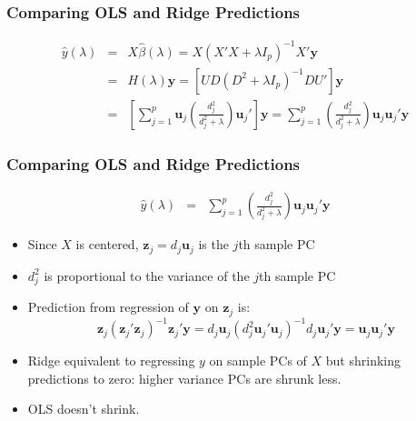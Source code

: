 \begin{frame}
  \frametitle{Comparing OLS and Ridge Predictions}

  \begin{eqnarray*}
    \widehat{y}(\lambda) &=&  X\widehat{\beta}(\lambda) = X\left( X'X + \lambda I_p \right)^{-1}X'\mathbf{y} \\
    &=& H(\lambda) \mathbf{y}=  \left[ UD\left( D^2 + \lambda I_p \right)^{-1}DU' \right]\mathbf{y} \\
  &=& \left[ \sum_{j=1}^p \mathbf{u}_j  \left( \frac{d_j^2}{d_j^2 + \lambda} \right)\mathbf{u}_j'\right]\mathbf{y} =  \sum_{j=1}^p   \left( \frac{d_j^2}{d_j^2 + \lambda} \right)\mathbf{u}_j\mathbf{u}_j'\mathbf{y}
  \end{eqnarray*}

\end{frame}
\begin{frame}
  \frametitle{Comparing OLS and Ridge Predictions}
  \small

  \begin{eqnarray*}
  \widehat{y}(\lambda) &=&
   \sum_{j=1}^p   \left( \frac{d_j^2}{d_j^2 + \lambda} \right)\mathbf{u}_j\mathbf{u}_j'\mathbf{y}
  \end{eqnarray*}

  \begin{itemize}
    \item Since $X$ is centered, $\mathbf{z}_j = d_j\mathbf{u}_j$ is the $j$th sample PC
    \item $d_j^2$ is proportional to the \alert{variance} of the $j$th sample PC
    \item Prediction from regression of $\mathbf{y}$ on $\mathbf{z}_j$ is: 
      \[ \mathbf{z}_j(\mathbf{z}_j'\mathbf{z}_j)^{-1}\mathbf{z}_j' \mathbf{y} = 
        d_j \mathbf{u}_j\left( d_j^2 \mathbf{u}_j' \mathbf{u}_j \right)^{-1} d_j \mathbf{u}_j'\mathbf{y} = \mathbf{u}_j\mathbf{u}_j'\mathbf{y}  
      \]
    \item Ridge equivalent to regressing $y$ on sample PCs of $X$ but shrinking predictions to zero: higher variance PCs are shrunk less.
    \item OLS doesn't shrink.
  \end{itemize}

\end{frame}
